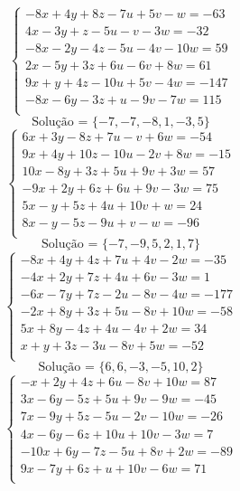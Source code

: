 \documentclass[12pt,oneside,a4paper]{article}
\begin{document}
\vspace{\baselineskip}
\begin{equation*}
\begin{cases}
-8x+4y+8z-7u+5v-w=-63 \\
4x-3y+z-5u-v-3w=-32 \\
-8x-2y-4z-5u-4v-10w=59 \\
2x-5y+3z+6u-6v+8w=61 \\
9x+y+4z-10u+5v-4w=-147 \\
-8x-6y-3z+u-9v-7w=115 \\
\end{cases}
\end{equation*}
\begin{equation*}
\text{Solução = }\{-7,-7,-8,1,-3,5\}
\end{equation*}
\vspace{\baselineskip}
\begin{equation*}
\begin{cases}
6x+3y-8z+7u-v+6w=-54 \\
9x+4y+10z-10u-2v+8w=-15 \\
10x-8y+3z+5u+9v+3w=57 \\
-9x+2y+6z+6u+9v-3w=75 \\
5x-y+5z+4u+10v+w=24 \\
8x-y-5z-9u+v-w=-96 \\
\end{cases}
\end{equation*}
\begin{equation*}
\text{Solução = }\{-7,-9,5,2,1,7\}
\end{equation*}
\vspace{\baselineskip}
\begin{equation*}
\begin{cases}
-8x+4y+4z+7u+4v-2w=-35 \\
-4x+2y+7z+4u+6v-3w=1 \\
-6x-7y+7z-2u-8v-4w=-177 \\
-2x+8y+3z+5u-8v+10w=-58 \\
5x+8y-4z+4u-4v+2w=34 \\
x+y+3z-3u-8v+5w=-52 \\
\end{cases}
\end{equation*}
\begin{equation*}
\text{Solução = }\{6,6,-3,-5,10,2\}
\end{equation*}
\vspace{\baselineskip}
\begin{equation*}
\begin{cases}
-x+2y+4z+6u-8v+10w=87 \\
3x-6y-5z+5u+9v-9w=-45 \\
7x-9y+5z-5u-2v-10w=-26 \\
4x-6y-6z+10u+10v-3w=7 \\
-10x+6y-7z-5u+8v+2w=-89 \\
9x-7y+6z+u+10v-6w=71 \\
\end{cases}
\end{equation*}
\end{document}
